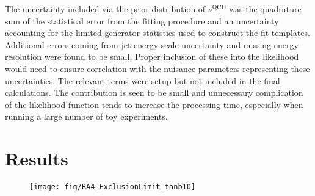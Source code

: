 The uncertainty included via the prior distribution of $\nu^{\textrm{QCD}}$ was
the quadrature sum of the statistical error from the fitting procedure and an
uncertainty accounting for the limited generator statistics used to construct
the fit templates. Additional errors coming from jet energy scale uncertainty
and missing energy resolution were found to be small. Proper inclusion of these
into the likelihood would need to ensure correlation with the nuisance
parameters representing these uncertainties. The relevant terms were setup but
not included in the final calculations. The contribution is seen to be small and
unnecessary complication of the likelihood function tends to increase the
processing time, especially when running a large number of toy experiments.


\section{Results}

\begin{figure}
\texttt{[image: fig/RA4\_ExclusionLimit\_tanb10]}
\end{figure}
